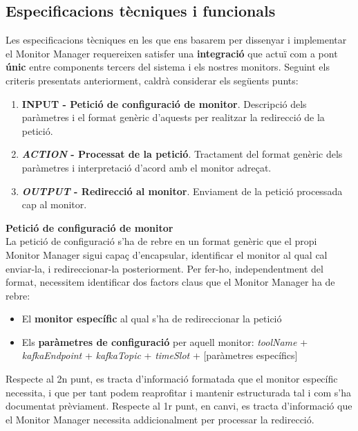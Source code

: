 \subsection{Especificacions tècniques i funcionals}

Les especificacions tècniques en les que ens basarem per dissenyar i implementar el Monitor Manager requereixen satisfer una \textbf{integració} que actuï com a pont \textbf{únic} entre components tercers del sistema i els nostres monitors. Seguint els criteris presentats anteriorment, caldrà considerar els següents punts:

\begin{enumerate}
\item \textbf{INPUT - Petició de configuració de monitor}. Descripció dels paràmetres i el format genèric d'aquests per realitzar la redirecció de la petició.
\item \textbf{\textit{ACTION} - Processat de la petició}. Tractament del format genèric dels paràmetres i interpretació d'acord amb el monitor adreçat.
\item \textbf{\textit{OUTPUT} - Redirecció al monitor}. Enviament de la petició processada cap al monitor.
\end{enumerate}

\noindent \textbf{\large Petició de configuració de monitor}\\

\noindent La petició de configuració s'ha de rebre en un format genèric que el propi Monitor Manager sigui capaç d'encapsular, identificar el monitor al qual cal enviar-la, i redireccionar-la posteriorment. Per fer-ho, independentment del format, necessitem identificar dos factors claus que el Monitor Manager ha de rebre:

\begin{itemize}
\item El \textbf{monitor específic} al qual s'ha de redireccionar la petició
\item Els \textbf{paràmetres de configuració} per aquell monitor: \textit{toolName} + \textit{kafkaEndpoint} + \textit{kafkaTopic} + \textit{timeSlot} + [paràmetres específics]
\end{itemize} 

Respecte al 2n punt, es tracta d'informació formatada que el monitor específic necessita, i que per tant podem reaprofitar i mantenir estructurada tal i com s'ha documentat prèviament. Respecte al 1r punt, en canvi, es tracta d'informació que el Monitor Manager necessita addicionalment per processar la redirecció.\\

